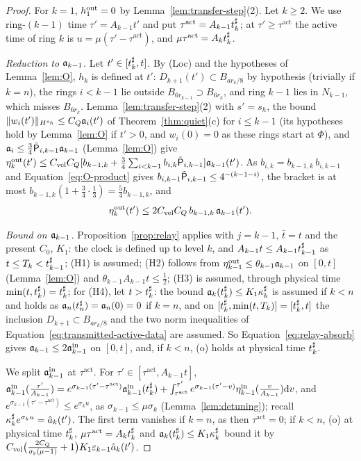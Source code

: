 \begin{proof}
For $k=1$, $h^{\mathrm{out}}_1=0$ by Lemma~\ref{lem:transfer-step}(2). Let $k\ge2$. We use
ring-$(k-1)$ time $\tau'=A_{k-1}t'$ and put $\tau^{\mathrm{act}}=A_{k-1}t^\sharp_k$; at
$\tau'\ge\tau^{\mathrm{act}}$ the active time of ring $k$ is
$u=\mu(\tau'-\tau^{\mathrm{act}})$, and $\mu\tau^{\mathrm{act}}=A_kt^\sharp_k$.

\emph{Reduction to $\mathfrak{a}_{k-1}$.} Let $t'\in[t^\sharp_k,t]$. By (Loc) and the
hypotheses of Lemma~\ref{lem:O}, $h_k$ is defined at $t'$:
$D_{k+1}(t')\subset B_{ar_k/8}$ by hypothesis (trivially if $k=n$), the rings
$i<k-1$ lie outside $B_{6r_{k-1}}\supset B_{6r_k}$, and ring $k-1$ lies in
$N_{k-1}$, which misses $B_{6r_k}$. Lemma~\ref{lem:transfer-step}(2) with
$s'=s_h$, the bound $\|w_i(t')\|_{H^{s_h}}\le C_Q\mathfrak{a}_i(t')$ of
Theorem~\ref{thm:quiet}(c) for $i\le k-1$ (its hypotheses hold by
Lemma~\ref{lem:O} if $t'>0$, and $w_i(0)=0$ as these rings start at $\Phi$), and
$\mathfrak{a}_i\le\frac34\tilde{\mathsf{P}}_{i,k-1}\mathfrak{a}_{k-1}$ (Lemma~\ref{lem:O}) give
$\eta^{\mathrm{out}}_k(t')\le C_{\mathrm{vel}} C_Q[b_{k-1,k}+\frac34\sum_{i<k-1}b_{i,k}\tilde{\mathsf{P}}_{i,k-1}]\mathfrak{a}_{k-1}(t')$.
As $b_{i,k}=b_{k-1,k}\,b_{i,k-1}$ and Equation~\eqref{eq:O-product} gives
$b_{i,k-1}\tilde{\mathsf{P}}_{i,k-1}\le4^{-(k-1-i)}$, the bracket is at most
$b_{k-1,k}(1+\frac34\cdot\frac13)=\frac54b_{k-1,k}$, and
\begin{equation}
\label{eq:Op-red}
\eta^{\mathrm{out}}_k(t')\le2C_{\mathrm{vel}} C_Q\,b_{k-1,k}\,\mathfrak{a}_{k-1}(t') .
\end{equation}

\emph{Bound on $\mathfrak{a}_{k-1}$.} Proposition~\ref{prop:relay} applies with $j=k-1$,
$\bar t=t$ and the present $C_0$, $K_1$: the clock is defined up to level
$k$, and $A_{k-1}t\le A_{k-1}t^\sharp_{k-1}$ as $t\le T_k<t^\sharp_{k-1}$; (H1) is assumed; (H2)
follows from $\eta^{\mathrm{out}}_{k-1}\le\theta_{k-1}\mathfrak{a}_{k-1}$ on $[0,t]$
(Lemma~\ref{lem:O}) and $\theta_{k-1}A_{k-1}t\le\frac12$; (H3) is assumed, through physical time $\min(t,t^\sharp_k)=t^\sharp_k$; for (H4), let $t>t^\sharp_k$: the bound
$\mathfrak{a}_k(t^\sharp_k)\le K_1\kappa^\sharp_k$ is assumed if $k<n$ and holds as
$\mathfrak{a}_n(t^\sharp_n)=\mathfrak{a}_n(0)=0$ if $k=n$, and on $[t^\sharp_k,\min(t,T_k)]=[t^\sharp_k,t]$
the inclusion $D_{k+1}\subset B_{ar_k/8}$ and the two norm inequalities of
Equation~\eqref{eq:transmitted-active-data} are assumed. So Equation~\eqref{eq:relay-absorb} gives
$\mathfrak{a}_{k-1}\le2\mathfrak{a}^{\mathrm{in}}_{k-1}$ on
$[0,t]$, and, if $k<n$, (o) holds at physical time $t^\sharp_k$.

We split $\mathfrak{a}^{\mathrm{in}}_{k-1}$ at $\tau^{\mathrm{act}}$. For
$\tau'\in[\tau^{\mathrm{act}},A_{k-1}t]$,
$\mathfrak{a}^{\mathrm{in}}_{k-1}(\frac{\tau'}{A_{k-1}})=e^{\sigma_{k-1}(\tau'-\tau^{\mathrm{act}})}\mathfrak{a}^{\mathrm{in}}_{k-1}(t^\sharp_k)
+\int_{\tau^{\mathrm{act}}}^{\tau'}e^{\sigma_{k-1}(\tau'-v)}\eta^{\mathrm{in}}_{k-1}(\frac{v}{A_{k-1}})\dd v$, and $e^{\sigma_{k-1}(\tau'-\tau^{\mathrm{act}})}\le e^{\sigma_ku}$, as
$\sigma_{k-1}\le\mu\sigma_k$ (Lemma~\ref{lem:detuning}); recall
$\kappa^\sharp_ke^{\sigma_ku}=\hat a_k(t')$. The first term vanishes if $k=n$, as then
$\tau^{\mathrm{act}}=0$; if $k<n$, (o) at physical time $t^\sharp_k$,
$\mu\tau^{\mathrm{act}}=A_kt^\sharp_k$ and $\mathfrak{a}_k(t^\sharp_k)\le K_1\kappa^\sharp_k$ bound it by
$C_{\mathrm{vel}} \big(\frac{2C_Q}{\sigma_\flat(\mu-1)}+1\big)K_1\varepsilon_{k-1}\hat a_k(t')$.


\end{proof}

